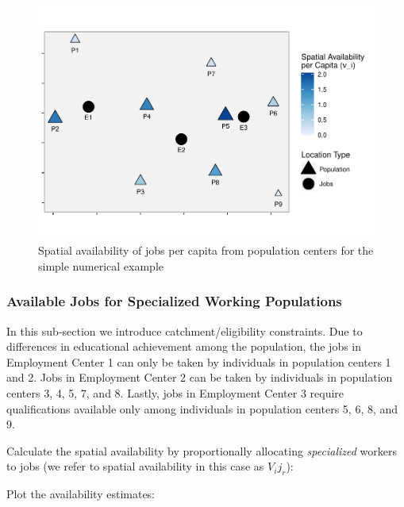 \documentclass[]{elsarticle} %
\begin{document}
\begin{figure}
\includegraphics[width=1\linewidth]{Spatial-Availability_files/figure-latex/toy-example-availability-jobs-per-capita-1} \caption{\label{fig:toy-example-availability-jobs-per-capita}Spatial availability of jobs per capita from population centers for the simple numerical example}\label{fig:toy-example-availability-jobs-per-capita}
\end{figure}

\hypertarget{available-jobs-for-specialized-working-populations}{%
\subsubsection{Available Jobs for Specialized Working
Populations}\label{available-jobs-for-specialized-working-populations}}

In this sub-section we introduce catchment/eligibility constraints. Due
to differences in educational achievement among the population, the jobs
in Employment Center 1 can only be taken by individuals in population
centers 1 and 2. Jobs in Employment Center 2 can be taken by individuals
in population centers 3, 4, 5, 7, and 8. Lastly, jobs in Employment
Center 3 require qualifications available only among individuals in
population centers 5, 6, 8, and 9.

Calculate the spatial availability by proportionally allocating
\emph{specialized} workers to jobs (we refer to spatial availability in
this case as \(V_ij_r\)):

Plot the availability estimates:
\end{document}
